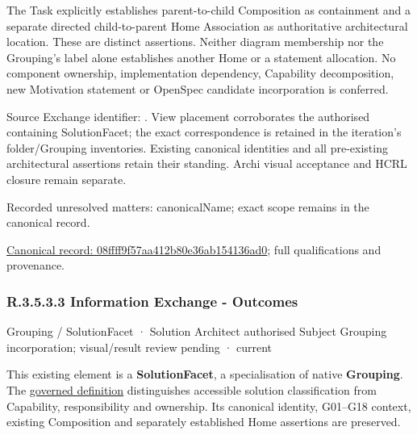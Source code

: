 The Task explicitly establishes parent-to-child Composition as containment and
a separate directed child-to-parent Home Association as authoritative architectural
location. These are distinct assertions. Neither diagram membership nor the
Grouping's label alone establishes another Home or a statement allocation.
No component ownership, implementation dependency, Capability decomposition,
new Motivation statement or OpenSpec candidate incorporation is conferred.



Source Exchange identifier: \texttt{}. View placement corroborates
the authorised containing SolutionFacet; the exact correspondence is retained in the
iteration's folder/Grouping inventories. Existing canonical identities and all
pre-existing architectural assertions retain their standing. Archi visual
acceptance and HCRL closure remain separate.


{\small Recorded unresolved matters: canonicalName; exact scope remains in the canonical record.}\par
{\footnotesize \href{../../../../../../../continuum/grouping/08ffff9f57aa412b80e36ab154136ad0.md}{Canonical record: 08ffff9f57aa412b80e36ab154136ad0}; full qualifications and provenance.}\par
\subsubsection*{R.3.5.3.3 Information Exchange - Outcomes}
\label{navigation:R.3.5.3.3}

\label{element:f5838796139b4157b91b53dfd56ea0a2}
{\small Grouping / SolutionFacet · Solution Architect authorised Subject Grouping incorporation; visual/result review pending · current}\par

This existing element is a \textbf{SolutionFacet}, a specialisation of native
\textbf{Grouping}. The \href{\detokenize{../../../../../../../governance/continuum-representation.md#solutionfacet-classification--1119-candidate}}{governed definition}
distinguishes accessible solution classification from Capability, responsibility
and ownership. Its canonical identity, G01–G18 context, existing Composition
and separately established Home assertions are preserved.



